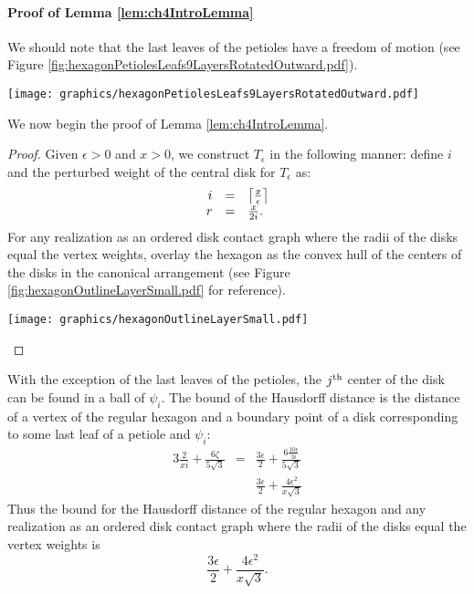 \paragraph{Proof of Lemma \ref{lem:ch4IntroLemma}}

We should note that the last leaves of the petioles have a freedom of motion (see Figure \ref{fig:hexagonPetiolesLeafs9LayersRotatedOutward.pdf}).  

\begin{minipage}{\linewidth}
\begin{center}
\texttt{[image: graphics/hexagonPetiolesLeafs9LayersRotatedOutward.pdf]}
\label{fig:hexagonPetiolesLeafs9LayersRotatedOutward.pdf}
\end{center}
\end{minipage}

We now begin the proof of Lemma \ref{lem:ch4IntroLemma}.

\begin{proof}
Given $\epsilon > 0$ and $x>0$,  we construct $T_\epsilon$ in the following manner: define $i$ and the perturbed weight of the central disk for $T_\epsilon$ as:
$$
\begin{array}{rcl}
i &=& \left\lceil \frac{x}{\epsilon} \right\rceil\\
r &=& \frac{x}{2i}.
\end{array}
$$
For any realization as an ordered disk contact graph where the radii of the disks equal the vertex weights, overlay the hexagon as the convex hull of the centers of the disks in the canonical arrangement (see Figure \ref{fig:hexagonOutlineLayerSmall.pdf} for reference).  

\begin{minipage}{\linewidth}
\begin{center}
\texttt{[image: graphics/hexagonOutlineLayerSmall.pdf]}
\label{fig:hexagonOutlineLayerSmall.pdf}
\end{center}
\end{minipage}
\end{proof}

With the exception of the last leaves of the petioles, the $j^\text{th}$ center of the disk can be found in a ball of $\psi_i$.  
The bound of the Hausdorff distance is the distance of a vertex of the regular hexagon and a boundary point of a disk corresponding to some last leaf of a petiole and $\psi_i$:
$$\begin{array}{rcl}
3 \frac{2}{xi} + \frac{6 \zeta}{5 \sqrt{3}}&=& \frac{3 \epsilon}{2}+ \frac{6 \frac{10\epsilon}{3i}}{5 \sqrt{3}}\\
&&\frac{3 \epsilon}{2}+\frac{4 \epsilon^2 }{x \sqrt{3}}
\end{array}
$$
Thus the bound for the Hausdorff distance of the regular hexagon and any realization as an ordered disk contact graph where the radii of the disks equal the vertex weights is $$\frac{3 \epsilon}{2}+\frac{4 \epsilon^2 }{x \sqrt{3}}.$$


